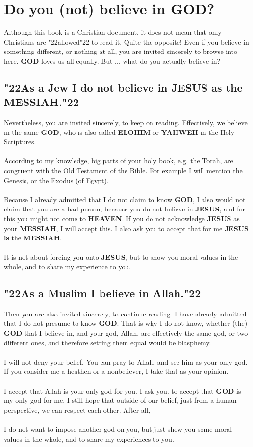 \documentclass[12pt,a5paper]{article}
\newcommand{\God}[0]{\textbf{GOD}}
\newcommand{\Elohim}[0]{\textbf{ELOHIM}}
\newcommand{\Heaven}[0]{\textbf{HEAVEN}}
\newcommand{\Jesus}[0]{\textbf{JESUS}}
\newcommand{\Messiah}[0]{\textbf{MESSIAH}}
\newcommand{\Yahweh}[0]{\textbf{YAHWEH}}
\newcommand{\q}[1]{\char"22{#1}\char"22 }
\begin{document}
	\newpage
	\section{Do you (not) believe in {\God}?}
		Although this book is a Christian document,
		it does not mean that only Christians are \q{allowed} to read it.
		Quite the opposite!
		Even if you believe in something different,
		or nothing at all,
		you are invited sincerely to browse into here.
		{\God} loves us all equally.
		But ... what do you actually believe in?

	\subsection{\q{As a Jew I do not believe in {\Jesus} as the {\Messiah}.}}
		Nevertheless,
		you are invited sincerely,
		to keep on reading.
		Effectively,
		we believe in the same {\God},
		who is also called {\Elohim} or {\Yahweh} in the Holy Scriptures.
		\\
		\\
		According to my knowledge,
		big parts of your holy book,
		e.g. the Torah,
		are congruent with the Old Testament of the Bible.
		For example I will mention the Genesis,
		or the Exodus (of Egypt).
		\\
		\\
		Because I already admitted that I do not claim to know {\God},
		I also would not claim that you are a bad person,
		because you do not believe in {\Jesus},
		and for this you might not come to {\Heaven}.
		If you do not acknowledge {\Jesus} as your {\Messiah},
		I will accept this.
		I also ask you to accept that for me {\Jesus} \textbf{is} the {\Messiah}.
		\\
		\\
		It is not about forcing you onto {\Jesus},
		but to show you moral values in the whole,
		and to share my experience to you.
		
	\subsection{\q{As a Muslim I believe in Allah.}}
		Then you are also invited sincerely,
		to continue reading.
		I have already admitted
		that I do not presume to know {\God}.
		That is why I do not know,
		whether (the) {\God} that I believe in,
		and your god,
		Allah,
		are effectively the same god,
		or two different ones,
		and therefore setting them equal would be blasphemy.
		\\
		\\
		I will not deny your belief.
		You can pray to Allah,
		and see him as your only god.
		If you consider me a heathen or a nonbeliever,
		I take that as your opinion.
		\\
		\\
		I accept that Allah is your only god for you.
		I ask you,
		to accept that {\God} is my only god for me.
		I still hope that outside of our belief,
		just from a human perspective,
		we can respect each other.
		After all,
		\\
		\\
		I do not want to impose another god on you,
		but just show you some moral values in the whole,
		and to share my experiences to you.
	
\end{document}
